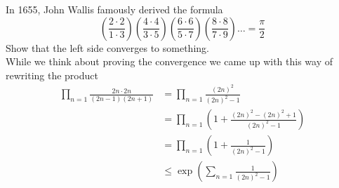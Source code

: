 In 1655, John Wallis famously derived the formula
$$
\left(\frac{2\cdot2}{1\cdot3}\right)
\left(\frac{4\cdot4}{3\cdot5}\right)
\left(\frac{6\cdot6}{5\cdot7}\right)
\left(\frac{8\cdot8}{7\cdot9}\right)
\ldots
= \frac{\pi}{2}
$$
Show that the left side converges to something.
\\

While we think about proving the convergence we came up with this way of rewriting the product
\begin{align*}
\prod_{n=1} \frac{2n\cdot2n}{(2n-1)(2n+1)}
&= \prod_{n=1} \frac{(2n)^2}{(2n)^2 -1} \\
&= \prod_{n=1} \left( 1 + \frac{(2n)^2 - (2n)^2 +1}{(2n)^2 -1} \right) \\
&= \prod_{n=1} \left( 1 + \frac{1}{(2n)^2 -1} \right) \\
&\leq \exp \left( \sum_{n=1} \frac{1}{(2n)^2 -1} \right)
\end{align*}
\\~\\